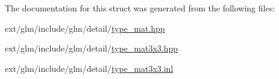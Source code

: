The documentation for this struct was generated from the following files\-:\begin{DoxyCompactItemize}
\item 
ext/glm/include/glm/detail/\hyperlink{type__mat_8hpp}{type\-\_\-mat.\-hpp}\item 
ext/glm/include/glm/detail/\hyperlink{type__mat3x3_8hpp}{type\-\_\-mat3x3.\-hpp}\item 
ext/glm/include/glm/detail/\hyperlink{type__mat3x3_8inl}{type\-\_\-mat3x3.\-inl}\end{DoxyCompactItemize}

